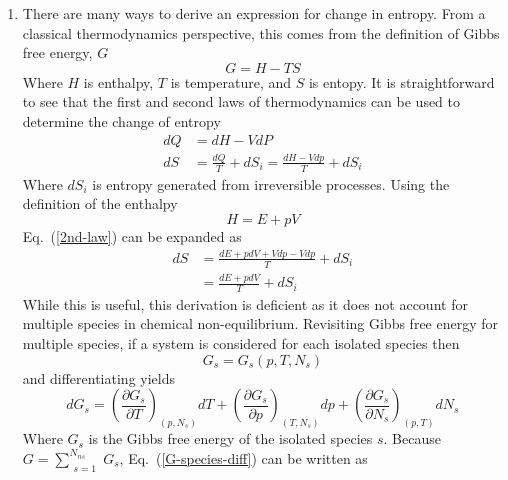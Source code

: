 \documentclass[a4paper]{article}
\newcommand{\eref}[1]{Eq.~(\ref{#1})}
\begin{document}
\begin{enumerate}
  \item There are many ways to derive an expression for change in entropy.  From
    a classical thermodynamics perspective, this comes from the definition of
    Gibbs free energy, $G$
    \begin{equation}
      G = H - TS
      \label{gfe-def}
    \end{equation}
    Where $H$ is enthalpy, $T$ is temperature, and $S$ is entopy.  It is
    straightforward to see that the first and second laws of thermodynamics can
    be used to determine the change of entropy
    \begin{align}
      dQ &= dH - VdP \label{1st-law}\\
      dS &= \frac{dQ}{T} + dS_{i}= \frac{dH - Vdp}{T} + dS_{i}
      \label{2nd-law}
    \end{align}
    Where $dS_i$ is entropy generated from irreversible processes. Using the
    definition of the enthalpy \begin{equation}
      H = E + pV
      \label{enthalpy-def}
    \end{equation}
    \eref{2nd-law} can be expanded as
    \begin{equation}
      \begin{aligned}
	      dS &= \frac{dE + pdV + Vdp - Vdp}{T} + dS_i\\
	         &= \frac{dE + pdV}{T} + dS_i
      \end{aligned}
      \label{s-one-gas}
    \end{equation}
    While this is useful, this derivation is deficient as it does not account
    for multiple species in chemical non-equilibrium.  Revisiting Gibbs free
    energy for multiple species, if a system is considered for each isolated
    species then
    \begin{equation}
      G_s = G_s(p,T,N_s)
      \label{G-species-def}
    \end{equation}
    and differentiating yields
    \begin{equation}
      dG_s = \left( \frac{\partial G_s}{\partial T} \right)_{(p,N_s)} dT
      + \left( \frac{\partial G_s}{\partial p} \right)_{(T,N_s)} dp
      + \left( \frac{\partial G_s}{\partial N_s} \right)_{(p,T)} dN_s
      \label{G-species-diff}
    \end{equation}
    Where $G_s$ is the Gibbs free energy of the isolated species $s$. Because 
    $G = \sum\limits_{\substack{s=1}}^{N_{ns}}{G_s}$, \eref{G-species-diff} can
    be written as
    \begin{equation}

\end{equation}
\end{enumerate}
\end{document}
